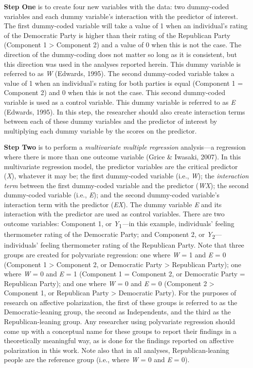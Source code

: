 \documentclass[authordate, meta]{jote-new-article}
\begin{document}
	\textbf{Step One} is to create four new variables with the data: two dummy-coded variables and each dummy variable's interaction with the predictor of interest. The first dummy-coded variable will take a value of 1 when an individual's rating of the Democratic Party is higher than their rating of the Republican Party (Component 1 > Component 2) and a value of 0 when this is not the case. The direction of the dummy-coding does not matter so long as it is consistent, but this direction was used in the analyses reported herein. This dummy variable is referred to as \emph{W} (Edwards, 1995). The second dummy-coded variable takes a value of 1 when an individual's rating for both parties is equal (Component 1 = Component 2) and 0 when this is not the case. This second dummy-coded variable is used as a control variable. This dummy variable is referred to as \emph{E} (Edwards, 1995). In this step, the researcher should also create interaction terms between each of these dummy variables and the predictor of interest by multiplying each dummy variable by the scores on the predictor.



	\textbf{Step Two} is to perform a \emph{multivariate multiple regression} analysis—a regression where there is more than one outcome variable (Grice \& Iwasaki, 2007). In this multivariate regression model, the predictor variables are the critical predictor (\emph{X}), whatever it may be; the first dummy-coded variable (i.e., \emph{W}); the \emph{interaction term }between the first dummy-coded variable and the predictor (\emph{WX}); the second dummy-coded variable (i.e., \emph{E}); and the second dummy-coded variable's interaction term with the predictor (\emph{EX}). The dummy variable \emph{E} and its interaction with the predictor are used as control variables. There are two outcome variables: Component 1, or \emph{Y}\textsubscript{1}\emph{—}in this example, individuals' feeling thermometer rating of the Democratic Party; and Component 2, or \emph{Y}\textsubscript{2}—individuals' feeling thermometer rating of the Republican Party. Note that three groups are created for polyvariate regression: one where \emph{W} = 1 and \emph{E} = 0 (Component 1 > Component 2, or Democratic Party > Republican Party); one where \emph{W} = 0 and \emph{E} = 1 (Component 1 = Component 2, or Democratic Party = Republican Party); and one where \emph{W} = 0 and \emph{E} = 0 (Component 2 > Component 1, or Republican Party > Democratic Party). For the purposes of research on affective polarization, the first of these groups is referred to as the Democratic-leaning group, the second as Independents, and the third as the Republican-leaning group. Any researcher using polyvariate regression should come up with a conceptual name for these groups to report their findings in a theoretically meaningful way, as is done for the findings reported on affective polarization in this work. Note also that in all analyses, Republican-leaning people are the reference group (i.e., where \emph{W} = 0 and \emph{E} = 0).
\end{document}
